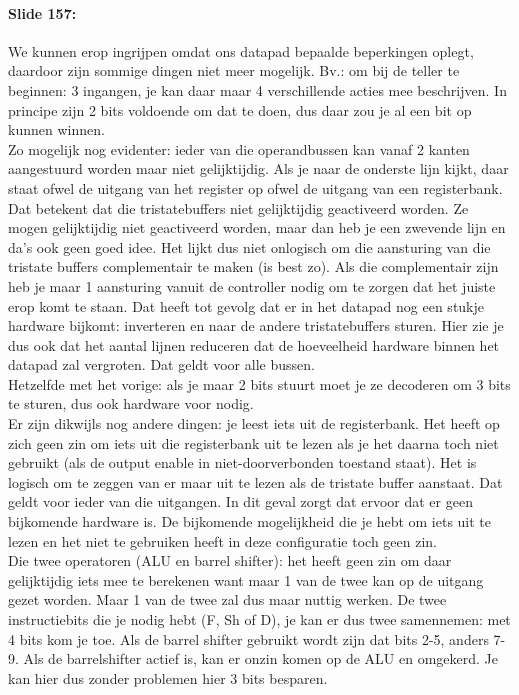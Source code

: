 \documentclass[10pt,a4paper]{book}
\begin{document}
\paragraph{Slide 157:} We kunnen erop ingrijpen omdat ons datapad bepaalde beperkingen oplegt, daardoor zijn sommige dingen niet meer mogelijk. Bv.: om bij de teller te beginnen: 3 ingangen, je kan daar maar 4 verschillende acties mee beschrijven. In principe zijn 2 bits voldoende om dat te doen, dus daar zou je al een bit op kunnen winnen.\\
Zo mogelijk nog evidenter: ieder van die operandbussen kan vanaf 2 kanten aangestuurd worden maar niet gelijktijdig. Als je naar de onderste lijn kijkt, daar staat ofwel de uitgang van het register op ofwel de uitgang van een registerbank. Dat betekent dat die tristatebuffers niet gelijktijdig geactiveerd worden. Ze mogen gelijktijdig niet geactiveerd worden, maar dan heb je een zwevende lijn en da's ook geen goed idee. Het lijkt dus niet onlogisch om die aansturing van die tristate buffers complementair te maken (is best zo). Als die complementair zijn heb je maar 1 aansturing vanuit de controller nodig om te zorgen dat het juiste erop komt te staan. Dat heeft tot gevolg dat er in het datapad nog een stukje hardware bijkomt: inverteren en naar de andere tristatebuffers sturen. Hier zie je dus ook dat het aantal lijnen %
 reduceren dat de hoeveelheid hardware binnen het datapad zal vergroten. Dat geldt voor alle bussen.\\
Hetzelfde met het vorige: als je maar 2 bits stuurt moet je ze decoderen om 3 bits te sturen, dus ook hardware voor nodig.\\
Er zijn dikwijls nog andere dingen: je leest iets uit de registerbank. Het heeft op zich geen zin om iets uit die registerbank uit te lezen als je het daarna toch niet gebruikt (als de output enable in niet-doorverbonden toestand staat). Het is logisch om te zeggen van er maar uit te lezen als de tristate buffer aanstaat. Dat geldt voor ieder van die uitgangen. In dit geval zorgt dat ervoor dat er geen bijkomende hardware is. De bijkomende mogelijkheid die je hebt om iets uit te lezen en het niet te gebruiken heeft in deze configuratie toch geen zin.\\
Die twee operatoren (ALU en barrel shifter): het heeft geen zin om daar gelijktijdig iets mee te berekenen want maar 1 van de twee kan op de uitgang gezet worden. Maar 1 van de twee zal dus maar nuttig werken. De twee instructiebits die je nodig hebt (F, Sh of D), je kan er dus twee samennemen: met 4 bits kom je toe. Als de barrel shifter gebruikt wordt zijn dat bits 2-5, anders 7-9. Als de barrelshifter actief is, kan er onzin komen op de ALU en omgekerd. Je kan hier dus zonder problemen hier 3 bits besparen.
\end{document}
